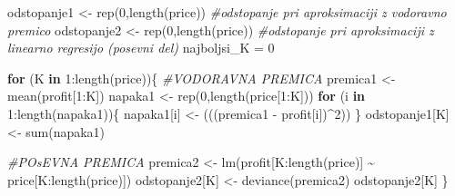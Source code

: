 \documentclass[
]{article}
\newenvironment{Shaded}{\begin{snugshade}}{\end{snugshade}}
\newcommand{\CommentTok}[1]{\textcolor[rgb]{0.56,0.35,0.01}{\textit{#1}}}
\newcommand{\ControlFlowTok}[1]{\textcolor[rgb]{0.13,0.29,0.53}{\textbf{#1}}}
\newcommand{\DecValTok}[1]{\textcolor[rgb]{0.00,0.00,0.81}{#1}}
\newcommand{\FunctionTok}[1]{\textcolor[rgb]{0.00,0.00,0.00}{#1}}
\newcommand{\NormalTok}[1]{#1}
\newcommand{\OtherTok}[1]{\textcolor[rgb]{0.56,0.35,0.01}{#1}}
\newcommand{\SpecialCharTok}[1]{\textcolor[rgb]{0.00,0.00,0.00}{#1}}
\begin{document}
\begin{Shaded}
\begin{Highlighting}[]
\NormalTok{      odstopanje1 }\OtherTok{\textless{}{-}} \FunctionTok{rep}\NormalTok{(}\DecValTok{0}\NormalTok{,}\FunctionTok{length}\NormalTok{(price)) }\CommentTok{\#odstopanje pri aproksimaciji z vodoravno premico}
\NormalTok{      odstopanje2 }\OtherTok{\textless{}{-}} \FunctionTok{rep}\NormalTok{(}\DecValTok{0}\NormalTok{,}\FunctionTok{length}\NormalTok{(price)) }\CommentTok{\#odstopanje pri aproksimaciji z linearno regresijo (posevni del)}
\NormalTok{      najboljsi\_K }\OtherTok{=} \DecValTok{0}
      
      \ControlFlowTok{for}\NormalTok{ (K }\ControlFlowTok{in} \DecValTok{1}\SpecialCharTok{:}\FunctionTok{length}\NormalTok{(price))\{}
        \CommentTok{\#VODORAVNA PREMICA}
\NormalTok{        premica1 }\OtherTok{\textless{}{-}} \FunctionTok{mean}\NormalTok{(profit[}\DecValTok{1}\SpecialCharTok{:}\NormalTok{K])}
\NormalTok{        napaka1 }\OtherTok{\textless{}{-}} \FunctionTok{rep}\NormalTok{(}\DecValTok{0}\NormalTok{,}\FunctionTok{length}\NormalTok{(price[}\DecValTok{1}\SpecialCharTok{:}\NormalTok{K]))}
        \ControlFlowTok{for}\NormalTok{ (i }\ControlFlowTok{in} \DecValTok{1}\SpecialCharTok{:}\FunctionTok{length}\NormalTok{(napaka1))\{}
\NormalTok{          napaka1[i] }\OtherTok{\textless{}{-}}\NormalTok{ (((premica1 }\SpecialCharTok{{-}}\NormalTok{ profit[i])}\SpecialCharTok{\^{}}\DecValTok{2}\NormalTok{))}
\NormalTok{        \}}
\NormalTok{        odstopanje1[K] }\OtherTok{\textless{}{-}} \FunctionTok{sum}\NormalTok{(napaka1)}
        
        
        \CommentTok{\#POsEVNA PREMICA}
\NormalTok{        premica2 }\OtherTok{\textless{}{-}} \FunctionTok{lm}\NormalTok{(profit[K}\SpecialCharTok{:}\FunctionTok{length}\NormalTok{(price)] }\SpecialCharTok{\textasciitilde{}}\NormalTok{ price[K}\SpecialCharTok{:}\FunctionTok{length}\NormalTok{(price)])}
\NormalTok{        odstopanje2[K] }\OtherTok{\textless{}{-}} \FunctionTok{deviance}\NormalTok{(premica2)}
\NormalTok{        odstopanje2[K]}
\NormalTok{      \}}
      

\end{Highlighting}
\end{Shaded}
\end{document}
